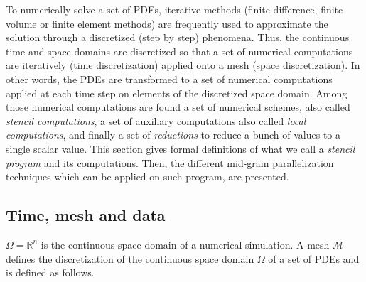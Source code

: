 To numerically solve a set of PDEs, iterative methods (finite difference, finite volume or finite element methods) are frequently used to approximate the solution through a discretized (step by step) phenomena. Thus, the continuous time and space domains are discretized so that a set of numerical computations are iteratively (time discretization) applied onto a mesh (space discretization). In other words, the PDEs are transformed to a set of numerical computations applied at each time step on elements of the discretized space domain. Among those numerical computations are found a set of numerical schemes, also called \textit{stencil computations}, a set of auxiliary computations also called \emph{local computations}, and finally a set of \emph{reductions} to reduce a bunch of values to a single scalar value.
This section gives formal definitions of what we call a \textit{stencil program} and its computations. Then, the different mid-grain parallelization techniques which can be applied on such program, are presented.

\subsection{Time, mesh and data}

$\Omega=\mathbb{R}^n$ is the continuous space domain of a numerical simulation. %
A mesh $\mathcal{M}$ defines the discretization of the continuous space domain $\Omega$ of a set of PDEs and is defined as follows.

